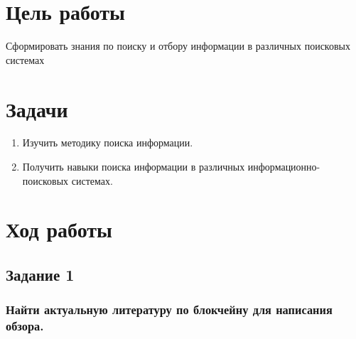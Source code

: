 \documentclass[14pt,a4paper,report]{report}
\begin{document}
\section{Цель работы}

Сформировать знания по поиску и отбору информации в различных поисковых системах

\section{Задачи}

\begin{enumerate}
	
	\item Изучить методику поиска информации.
	
	\item Получить навыки поиска информации в различных информационно-поисковых системах.
	
\end{enumerate}

\clearpage

\section{Ход работы}

\subsection{Задание 1}

\subsubsection{Найти актуальную литературу по блокчейну для написания обзора.}
\end{document}
